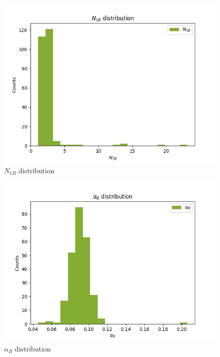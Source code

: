 \documentclass[
]{article}
\begin{document}
\begin{figure}
\centering
\includegraphics{pngplots/param5.png}
\caption{\(N_{1B}\) distribution}
\end{figure}

\begin{figure}
\centering
\includegraphics{pngplots/param6.png}
\caption{\(\alpha_B\) distribution}
\end{figure}
\end{document}
